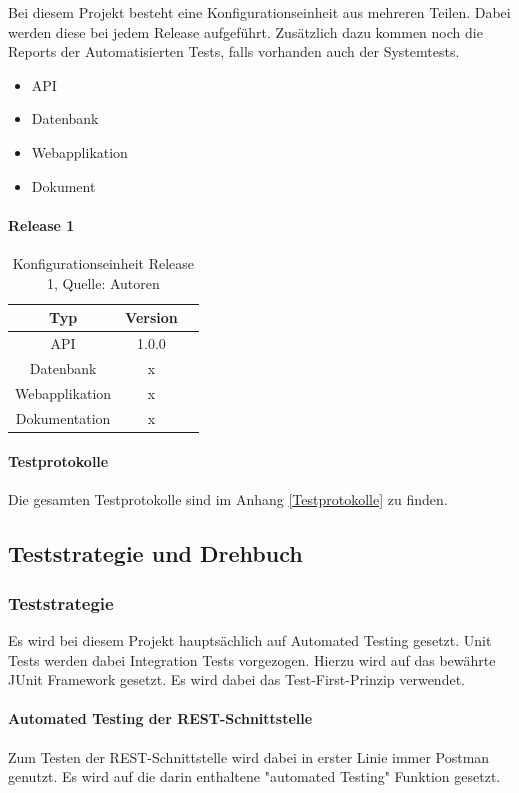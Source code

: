 Bei diesem Projekt besteht eine Konfigurationseinheit aus mehreren Teilen. Dabei werden diese bei jedem Release aufgeführt. Zusätzlich dazu kommen noch die Reports der Automatisierten Tests, falls vorhanden auch der Systemtests.
\begin{itemize}
\item API
\item Datenbank
\item Webapplikation
\item Dokument
\end{itemize}
\paragraph{Release 1}

\begin{table}[H]
\setlength\extrarowheight{2pt} %
\begin{tabularx}{\textwidth}{|C|C|C|}
\hline
\textbf{Typ} &  \textbf{Version}  \\

\hline
API &  1.0.0\\
\hline
Datenbank &  x\\
\hline
Webapplikation  & x\\
\hline
Dokumentation & x\\
\hline
\end{tabularx}
\caption{ \label{tbl: Konfigurationseinheit Release 1}Konfigurationseinheit Release 1, Quelle: Autoren}
\end{table}

\paragraph{Testprotokolle}
Die gesamten Testprotokolle sind im Anhang \ref{Testprotokolle} zu finden. 
\newpage
\subsection{Teststrategie und Drehbuch}
\subsubsection{Teststrategie}
Es wird bei diesem Projekt hauptsächlich auf Automated Testing gesetzt.
Unit Tests werden dabei Integration Tests vorgezogen.
Hierzu wird auf das bewährte JUnit Framework gesetzt.
Es wird dabei das Test-First-Prinzip verwendet.

\paragraph{Automated Testing der REST-Schnittstelle}
Zum Testen der REST-Schnittstelle wird dabei in erster Linie immer Postman genutzt. Es wird auf die darin enthaltene "automated Testing" Funktion gesetzt. 

